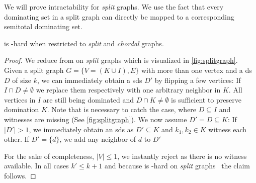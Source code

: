 We will prove intractability for \textit{split} graphs. 
We use the fact that every dominating set in a split graph can directly be mapped to a corresponding semitotal dominating set.

\begin{theorem}\label{lemma:splitgraph}
    \sdom is \WONEhs-hard when restricted to \textit{split} and \textit{chordal} graphs.
\end{theorem}

\begin{proof}

    We reduce from \dom on \textit{split} graphs which is visualized in \cref{fig:splitgraph}.
    Given a split graph $G = \{V = (K \cup I), E\}$ with more than one vertex and a ds $D$ of size $k$, we can immediately obtain a sds $D'$ by flipping a few vertices:
    If $I \cap D \neq \emptyset$ we replace them respectively with one arbitrary neighbor in $K$.
    All vertices in $I$ are still being dominated and $D \cap K \neq \emptyset$ is sufficient to preserve domination $K$. 
    Note that is necessary to catch the case, where $D \subseteq I$ and witnesses are missing (See \cref{fig:splitgraph}).
    We now assume $D' = D \subseteq K$:
    If $|D'| > 1$, we immediately obtain an sds as $D' \subseteq K$ and $k_1,k_2\in K$ witness each other.
    If $D' = \{d\}$, we add any neighbor of $d$ to $D'$
    
    For the sake of completeness, $|V| \leq 1$, we instantly reject as there is no witness available.
    In all cases $k' \leq k + 1$ and because \dom is \WTWOhs-hard on \textit{split} graphs~\cite{Raman2008} the claim follows.

%    


\end{proof}

